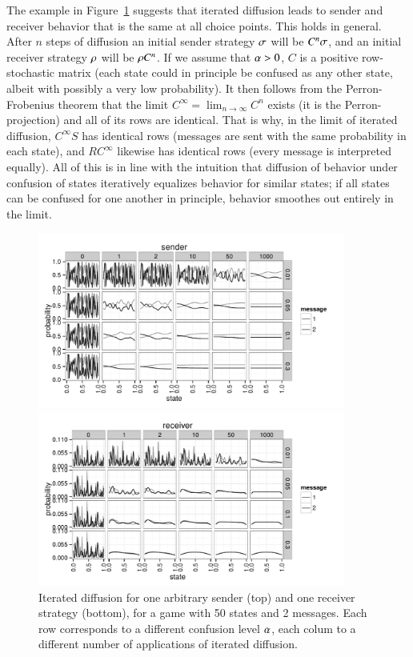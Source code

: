 The example in Figure~\ref{fig:confusion-SenRec} suggests that
iterated diffusion leads to sender and receiver behavior that is the
same at all choice points. This holds in general. After $n$ steps of
diffusion an initial sender strategy $\sigma$ will be $C^n \sigma$,
and an initial receiver strategy $\rho$ will be $\rho C^n$. If
we assume that $\alpha > 0$, $C$ is a positive row-stochastic
matrix (each state could in principle be confused as any other state,
albeit with possibly a very low probability). It then follows from the
Perron-Frobenius theorem that the limit $C^\infty = \lim_{n
  \rightarrow \infty} C^n$ exists (it is the Perron-projection) and
all of its rows are identical. That is why, in the limit of iterated
diffusion, $C^\infty S$ has identical rows (messages are sent with the
same probability in each state), and $R C^\infty$ likewise has
identical rows (every message is interpreted equally). All of this is
in line with the intuition that diffusion of behavior under confusion
of states iteratively equalizes behavior for similar states; if all
states can be confused for one another in principle, behavior smoothes
out entirely in the limit.

\begin{figure}
  \centering

  \includegraphics[width=0.9\textwidth]{plots/confusion_sender.pdf}

  \includegraphics[width=0.9\textwidth]{plots/confusion_receiver.pdf}

  \caption{Iterated diffusion for one arbitrary sender (top) and one
    receiver strategy (bottom), for a game with 50 states and 2
    messages. Each row corresponds to a different confusion level
    $\alpha$, each colum to a different number of applications of
    iterated diffusion.}
  \label{fig:confusion-SenRec}
\end{figure}

